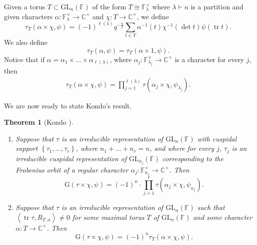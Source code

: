 \documentclass[12pt, reqno]{amsart}
\newtheorem{theorem}{Theorem}[section]
\theoremstyle{definition}
\theoremstyle{definition}
\theoremstyle{definition}
\newcommand{\cComplex}{\mathbb{C}}
\newcommand{\multiplicativegroup}[1]{#1^{\times}}
\newcommand{\lengthof}{\ell}
\newcommand{\innerproduct}[2]{\left\langle #1,#2\right\rangle}
\newcommand{\fieldCharacter}{\psi}
\newcommand{\trace}{\operatorname{tr}}
\newcommand{\GL}{\mathrm{GL}}
\newcommand{\finiteField}{\mathbb{F}}
\newcommand{\finiteFieldExtension}[1]{\finiteField_{#1}}
\newcommand{\GaussSumSingleTorusCharacter}[3]{\tau_{#1}\left(#2, #3\right)}
\newcommand{\GaussSumScalar}[2]{\mathrm{G}\left(#1, #2\right)}
\newcommand{\GaussSumCharacter}[3]{\tau\left(#1 \times #2, #3\right)}
\newcommand{\GaussSumTorusCharacter}[4]{\tau_{#1}\left(#2 \times #3, #4\right)}
\begin{document}
Given a torus $T \subset \GL_n\left(\finiteField\right)$ of the form $T \cong \multiplicativegroup{\finiteFieldExtension{\lambda}}$ where $\lambda \vdash n$ is a partition and given characters $\alpha \colon \multiplicativegroup{\finiteFieldExtension{\lambda}} \to \multiplicativegroup{\cComplex}$ and $\chi \colon T \to \multiplicativegroup{\cComplex}$, we define $$\GaussSumTorusCharacter{T}{\alpha}{\chi}{\fieldCharacter} = \left(-1\right)^{\lengthof\left(\lambda\right)} q^{-\frac{n}{2}} \sum_{t \in T} \alpha^{-1}\left(t\right) \chi^{-1}\left(\det t\right) \fieldCharacter\left(\trace t\right).$$
We also define $$\GaussSumSingleTorusCharacter{T}{\alpha}{\fieldCharacter} = \GaussSumTorusCharacter{T}{\alpha}{1}{\fieldCharacter}.$$
Notice that if $\alpha = \alpha_1 \times \dots \times \alpha_{\lengthof\left(\lambda\right)}$, where $\alpha_j \colon \multiplicativegroup{\finiteFieldExtension{\lambda_j}} \to \multiplicativegroup{\cComplex}$ is a character for every $j$, then
\begin{align}
	\label{eq:Gauss_multiplicitive}
	\GaussSumTorusCharacter{T}{\alpha}{\chi}{\fieldCharacter} = \prod_{j=1}^{\lengthof\left(\lambda\right)} \GaussSumCharacter{\alpha_j}{\chi}{\fieldCharacter_{\lambda_j}}.
\end{align}

We are now ready to state Kondo's result.
\begin{theorem}[Kondo {\cite{Kondo1963}}]\label{thm:KondoClassical}
	\begin{enumerate}
		\item Suppose that $\tau$ is an irreducible representation of $\GL_n\left(\finiteField\right)$ with cuspidal support $\left\{\tau_1,\dots, \tau_r\right\}$, where $n_1 + \dots + n_r = n$, and where for every $j$, $\tau_j$ is an irreducible cuspidal representation of $\GL_{n_j}\left(\finiteField\right)$ corresponding to the Frobenius orbit of a regular character $\alpha_j \colon \multiplicativegroup{\finiteFieldExtension{n_j}} \to \multiplicativegroup{\cComplex}$. Then
		$$\GaussSumScalar{\tau \times \chi}{\fieldCharacter} = \left(-1\right)^n \cdot \prod_{j=1}^r \GaussSumCharacter{\alpha_j}{\chi}{\fieldCharacter_{n_j}}.$$
		\item Suppose that $\tau$ is an irreducible representation of $\GL_n\left(\finiteField\right)$ such that $\innerproduct{\trace \tau}{R_{T, \alpha}} \ne 0$ for some maximal torus $T$ of $\GL_n\left(\finiteField\right)$ and some character $\alpha \colon T \to \multiplicativegroup{\cComplex}$. Then $$\GaussSumScalar{\tau \times \chi}{\fieldCharacter} = \left(-1\right)^n \GaussSumTorusCharacter{T}{\alpha}{\chi}{\fieldCharacter}.$$
	\end{enumerate}
\end{theorem}
\end{document}
